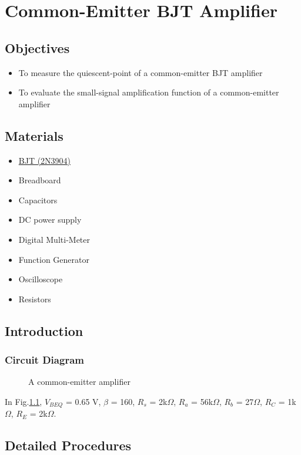 \chapter{Common-Emitter BJT Amplifier}


\section{Objectives}
\begin{itemize}
    \item To measure the quiescent-point of a common-emitter BJT amplifier
    \item To evaluate the small-signal amplification function of a common-emitter amplifier
\end{itemize}

\section{Materials}
\begin{itemize}
    \item \hyperref[2N3904_1]{BJT (2N3904)}
    \item Breadboard
    \item Capacitors
    \item DC power supply
    \item Digital Multi-Meter
    \item Function Generator
    \item Oscilloscope
    \item Resistors
\end{itemize}

\section{Introduction}
    \subsection{Circuit Diagram}
    \begin{figure}[h]
        \centering
        
        \caption{A common-emitter amplifier}
        \label{lab6f}
    \end{figure}
    \FloatBarrier
In Fig.\ref{lab6f}, $V_{BEQ}$ = 0.65 V, $\beta$ = 160, $R_s$ = 2k$\Omega$, $R_a$ = 56k$\Omega$, $R_b$ = 27$\Omega$, $R_C$ = 1k$\Omega$, $R_E$ = 2k$\Omega$.

\section{Detailed Procedures}

